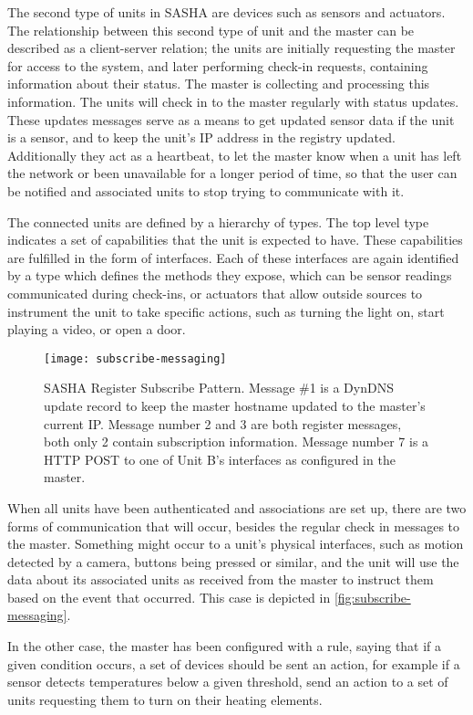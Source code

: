 The second type of units in SASHA are devices such as sensors and actuators. The relationship between this second type of unit and the master can be described as a client-server relation; the units are initially requesting the master for access to the system, and later performing check-in requests, containing information about their status. The master is collecting and processing this information. The units will check in to the master regularly with status updates. These updates messages serve as a means to get updated sensor data if the unit is a sensor, and to keep the unit's IP address in the registry updated. Additionally they act as a heartbeat, to let the master know when a unit has left the network or been unavailable for a longer period of time, so that the user can be notified and associated units to stop trying to communicate with it.

The connected units are defined by a hierarchy of types. The top level type indicates a set of capabilities that the unit is expected to have. These capabilities are fulfilled in the form of interfaces. Each of these interfaces are again identified by a type which defines the methods they expose, which can be sensor readings communicated during check-ins, or actuators that allow outside sources to instrument the unit to take specific actions, such as turning the light on, start playing a video, or open a door.

\begin{figure}[ht!]
    \centering
    \texttt{[image: subscribe-messaging]}\label{fig:subscribe-messaging}
    \caption{SASHA Register Subscribe Pattern. Message \#1 is a DynDNS update record to keep the master hostname updated to the master's current IP. Message number 2 and 3 are both register messages, both only 2 contain subscription information. Message number 7 is a HTTP POST to one of Unit B's interfaces as configured in the master.}
\end{figure}

When all units have been authenticated and associations are set up, there are two forms of communication that will occur, besides the regular check in messages to the master. Something might occur to a unit's physical interfaces, such as motion detected by a camera, buttons being pressed or similar, and the unit will use the data about its associated units as received from the master to instruct them based on the event that occurred. This case is depicted in \autoref{fig:subscribe-messaging}.

In the other case, the master has been configured with a rule, saying that if a given condition occurs, a set of devices should be sent an action, for example if a sensor detects temperatures below a given threshold, send an action to a set of units requesting them to turn on their heating elements.
